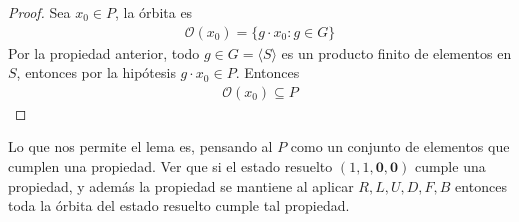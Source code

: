 \documentclass{article}
\theoremstyle{definition}
\begin{document}
\begin{proof}
    Sea $x_0 \in P$, la órbita es
    \begin{align*}
        \mathcal{O}(x_0)=\{g\cdot x_0: g\in G\}
    \end{align*}
    Por la propiedad anterior, todo $g\in G=\langle S\rangle $ es un producto finito de elementos en $S$, entonces por la hipótesis $g\cdot x_0\in P$. Entonces
    \begin{align*}
        \mathcal{O}(x_0)\subseteq P
    \end{align*}
\end{proof}
Lo que nos permite el lema es, pensando al $P$ como un conjunto de elementos que cumplen una propiedad. Ver que si el estado resuelto $(1,1,\mathbf{0},\mathbf{0})$ cumple una propiedad, y además la propiedad se mantiene al aplicar $R,L,U,D,F,B$ entonces toda la órbita del estado resuelto cumple tal propiedad.
\end{document}
